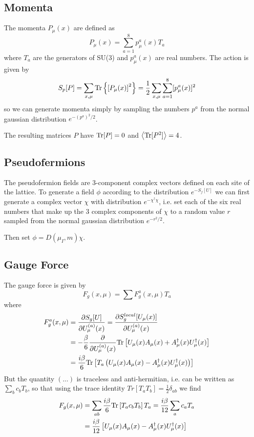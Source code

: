 \documentclass[a4paper,12pt]{article}
\newcommand{\Tr}{{\rm Tr}}
\begin{document}
\subsection{Momenta}
The momenta $P_{\mu}(x)$ are defined as
\begin{equation}
 P_{\mu}(x) = \sum_{a=1}^8 p^a_{\mu}(x) T_a 
\end{equation}
where $T_a$ are the generators of SU(3) and $p^a_{\mu}(x)$ are real numbers.
The action is given by
\begin{equation}
 S_p[P] = \sum_{x,\mu}\Tr\left\{\left[P_{\mu}(x)\right]^2\right\} = \frac{1}{2}\sum_{x,\mu}\sum_{a=1}^8 [p^a_{\mu}(x)]^2
\end{equation}
so we can generate momenta simply by sampling the numbers $p^a$ from the normal gaussian distribution $e^{-(p^a)^2/2}$.

The resulting matrices $P$ have $\Tr[P]=0$ and $\left\langle \Tr [P^2]\right\rangle = 4$.

\subsection{Pseudofermions}
The pseudofermion fields are 3-component complex vectors defined on each site of the lattice. To generate a field $\phi$ according to the distribution $e^{-S_f[U]}$ we 
can first generate a complex vector $\chi$ with distribution $e^{-\chi^{\dagger}\chi}$, i.e. set each of 
the six real numbers that make up the 3 complex components of $\chi$ to a random value $r$ sampled from the normal gaussian distribution $e^{-r^2/2}$.

Then set $\phi = D(\mu_I,m)\chi$.

\subsection{Gauge Force}
The gauge force is given by
\begin{equation}
F_g(x,\mu) = \sum F_g^a(x,\mu) T_a
\end{equation}
where
\begin{align}
F_g^a(x,\mu) &= \frac{\partial S_g[U]}{\partial U_{\mu}^{(a)}(x)} = \frac{\partial S_g^{local}[U_{\mu}(x)]}{\partial U_{\mu}^{(a)}(x)} \\ 
&= -\frac{\beta}{6} \frac{\partial }{\partial U_{\mu}^{(a)}(x)} \Tr \left[ U_{\mu}(x) A_{\mu}(x) + A_{\mu}^{\dagger}(x)U_{\mu}^{\dagger}(x)  \right] \\
&= \frac{i\beta}{6} \Tr \left[ T_a \left( U_{\mu}(x) A_{\mu}(x) - A_{\mu}^{\dagger}(x)U_{\mu}^{\dagger}(x)\right) \right]
\end{align}
But the quantity $(...)$ is traceless and anti-hermitian, i.e. can be written as $\sum_b c_b T_b$, so that using the trace identity $Tr[T_aT_b] = \tfrac{1}{2}\delta_{ab}$ we find
\begin{align}
F_g(x,\mu) &= \sum_{ab} \frac{i\beta}{6} \Tr \left[ T_a c_b T_b \right] T_a = \frac{i\beta}{12} \sum_a c_a T_a \\
&= \frac{i\beta}{12} \left[ U_{\mu}(x) A_{\mu}(x) - A_{\mu}^{\dagger}(x)U_{\mu}^{\dagger}(x) \right]
\end{align}
\end{document}
